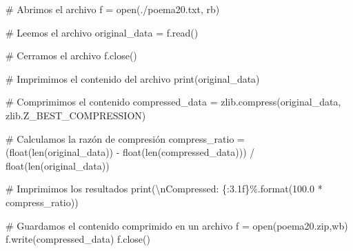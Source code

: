 \documentclass[
  spanish,
  letterpaper,
]{scrbook}
\newenvironment{Shaded}{\begin{snugshade}}{\end{snugshade}}
\newcommand{\BuiltInTok}[1]{\textcolor[rgb]{0.00,0.23,0.31}{#1}}
\newcommand{\CharTok}[1]{\textcolor[rgb]{0.13,0.47,0.30}{#1}}
\newcommand{\CommentTok}[1]{\textcolor[rgb]{0.37,0.37,0.37}{#1}}
\newcommand{\FloatTok}[1]{\textcolor[rgb]{0.68,0.00,0.00}{#1}}
\newcommand{\NormalTok}[1]{\textcolor[rgb]{0.00,0.23,0.31}{#1}}
\newcommand{\OperatorTok}[1]{\textcolor[rgb]{0.37,0.37,0.37}{#1}}
\newcommand{\SpecialCharTok}[1]{\textcolor[rgb]{0.37,0.37,0.37}{#1}}
\newcommand{\StringTok}[1]{\textcolor[rgb]{0.13,0.47,0.30}{#1}}
\theoremstyle{definition}
\theoremstyle{remark}
\begin{document}
\begin{Shaded}
\begin{Highlighting}[]
\CommentTok{\# Abrimos el archivo }
\NormalTok{f }\OperatorTok{=} \BuiltInTok{open}\NormalTok{(}\StringTok{\textquotesingle{}./poema20.txt\textquotesingle{}}\NormalTok{, }\StringTok{\textquotesingle{}rb\textquotesingle{}}\NormalTok{)}

\CommentTok{\# Leemos el archivo}
\NormalTok{original\_data }\OperatorTok{=}\NormalTok{ f.read()}

\CommentTok{\# Cerramos el archivo}
\NormalTok{f.close()}

\CommentTok{\# Imprimimos el contenido del archivo}
\BuiltInTok{print}\NormalTok{(original\_data)}

\CommentTok{\# Comprimimos el contenido}
\NormalTok{compressed\_data }\OperatorTok{=}\NormalTok{ zlib.compress(original\_data, zlib.Z\_BEST\_COMPRESSION)}

\CommentTok{\# Calculamos la razón de compresión}
\NormalTok{compress\_ratio }\OperatorTok{=}\NormalTok{ (}\BuiltInTok{float}\NormalTok{(}\BuiltInTok{len}\NormalTok{(original\_data)) }\OperatorTok{{-}} \BuiltInTok{float}\NormalTok{(}\BuiltInTok{len}\NormalTok{(compressed\_data))) }\OperatorTok{/} \BuiltInTok{float}\NormalTok{(}\BuiltInTok{len}\NormalTok{(original\_data))}

\CommentTok{\# Imprimimos los resultados}
\BuiltInTok{print}\NormalTok{(}\StringTok{\textquotesingle{}}\CharTok{\textbackslash{}n}\StringTok{Compressed: }\SpecialCharTok{\{:3.1f\}}\StringTok{\%\textquotesingle{}}\NormalTok{.}\BuiltInTok{format}\NormalTok{(}\FloatTok{100.0} \OperatorTok{*}\NormalTok{ compress\_ratio))}

\CommentTok{\# Guardamos el contenido comprimido en un archivo}
\NormalTok{f }\OperatorTok{=} \BuiltInTok{open}\NormalTok{(}\StringTok{\textquotesingle{}poema20.zip\textquotesingle{}}\NormalTok{,}\StringTok{\textquotesingle{}wb\textquotesingle{}}\NormalTok{)}
\NormalTok{f.write(compressed\_data)}
\NormalTok{f.close()}
\end{Highlighting}
\end{Shaded}
\end{document}
